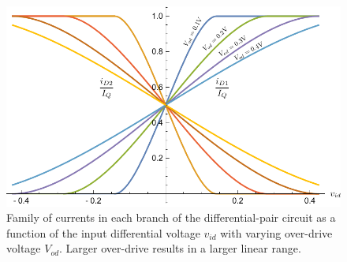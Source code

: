 \begin{figure}[tb]
\begin{center}
\includegraphics[width=.7\columnwidth]{mosdiffamp_id_od}
\end{center}
\caption{Family of currents in each branch of the differential-pair circuit as a function of the input differential voltage $v_{id}$ with varying over-drive voltage $V_{od}$.  Larger over-drive results in a larger linear range.}
\label{fig:mosdiffamp_id_od}
\end{figure}


